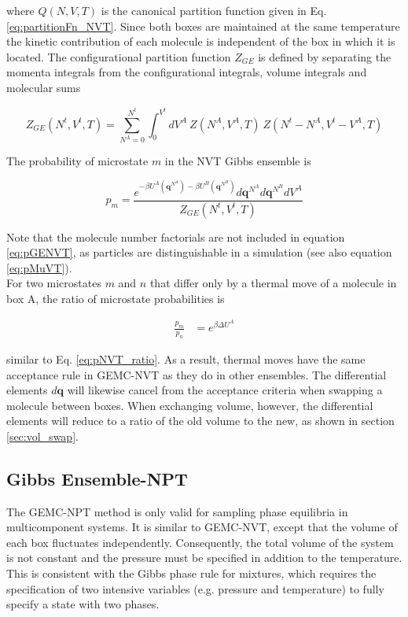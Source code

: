 where $Q(N,V,T)$ is the canonical partition function given in Eq. \ref{eq:partitionFn_NVT}. 
Since both boxes are maintained at the same temperature 
the kinetic contribution of each molecule is independent of the box in which it is located.
The configurational partition function $Z_{GE}$ is defined by separating the momenta integrals 
from the configurational integrals, volume integrals and molecular sums

\begin{equation}
Z_{GE}\left(N^t,V^t,T\right) = \sum^{N^t}_{N{^A}=0} \int^{V^t}_0 dV^A\ Z(N^A,V^A,T)\ Z(N^t-N^A,V^t-V^A,T)
\label{eq:configPartitionFn_GENVT}
\end{equation}

The probability of microstate $m$ in the NVT Gibbs ensemble is

\begin{equation}
p_m = \frac{e^{-\beta U^A \left(\textbf{q}^{N^A}\right) -\beta U^B \left(\textbf{q}^{N^B}\right)} d\textbf{q}^{N^A} d\textbf{q}^{N^B} dV^A}{Z_{GE}(N^t,V^t,T)}
\label{eq:pGENVT}
\end{equation}

Note that the molecule number factorials are not included in equation \ref{eq:pGENVT}, 
as particles are distinguishable in a simulation (see also equation \ref{eq:pMuVT}). \\

For two microstates $m$ and $n$ that differ only by a thermal move of a molecule in box A, the ratio of microstate probabilities is

\begin{align}
\label{eq:pGENVT_ratio}
\frac{p_m}{p_n}&= e^{\beta \Delta U^A}
\end{align}

similar to Eq. \ref{eq:pNVT_ratio}. 
As a result, thermal moves have the same acceptance rule in GEMC-NVT as they do in other ensembles.
The differential elements $d\mathbf{q}$ will likewise cancel from the acceptance criteria when swapping a molecule between boxes.
When exchanging volume, however, the differential elements will reduce to a ratio of the old volume to the new, as shown in section \ref{sec:vol_swap}.

\subsection{Gibbs Ensemble-NPT} 
\label{sec:gibbs_npt}

The GEMC-NPT method is only valid for sampling phase equilibria in multicomponent systems. 
It is similar to GEMC-NVT, except that the volume of each box fluctuates independently.
Consequently, the total volume of the system is not constant and the 
pressure must be specified in addition to the temperature.
This is consistent with the Gibbs phase rule for mixtures, which requires the specification of two intensive
variables (e.g. pressure and temperature) to fully specify a state with two phases. \\

